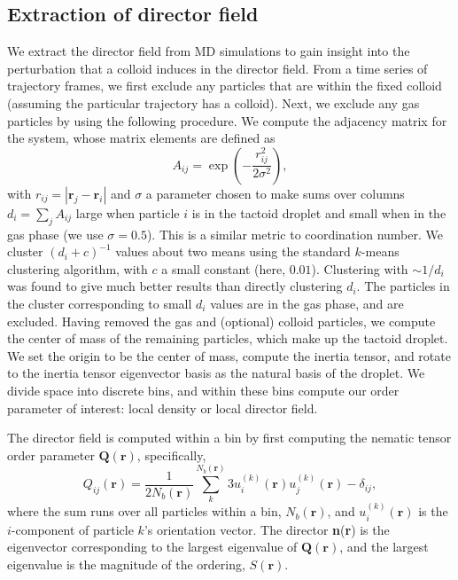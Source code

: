\documentclass[%
 aip,
 amsmath,amssymb,
 reprint,%
]{revtex4-1}
\begin{document}
\subsection{Extraction of director field} \label{ss:tactoidExtractDirectorField}
We extract the director field from MD simulations to gain insight into the perturbation that a colloid induces in the director field. From a time series of trajectory frames, we first exclude any particles that are within the fixed colloid (assuming the particular trajectory has a colloid). Next, we exclude any gas particles by using the following procedure. We compute the adjacency matrix for the system, whose matrix elements are defined as
\begin{equation}
A_{ij}=\exp\left(-\frac{r_{ij}^2}{2\sigma^2}\right),
\end{equation}
with $r_{ij} = |\textbf{r}_j-\textbf{r}_i|$ and $\sigma$ a parameter chosen to make sums over columns $d_i = \sum_j A_{ij}$ large when particle $i$ is in the tactoid droplet and small when in the gas phase (we use $\sigma=0.5$). This is a similar metric to coordination number. We cluster $(d_i+c)^{-1}$ values about two means using the standard $k$-means clustering algorithm, with $c$ a small constant (here, $0.01$). Clustering with $\sim 1/d_i$ was found to give much better results than directly clustering $d_i$. The particles in the cluster corresponding to small $d_i$ values are in the gas phase, and are excluded. Having removed the gas and (optional) colloid particles, we compute the center of mass of the remaining particles, which make up the tactoid droplet. We set the origin to be the center of mass, compute the inertia tensor, and rotate to the inertia tensor eigenvector basis as the natural basis of the droplet. We divide space into discrete bins, and within these bins compute our order parameter of interest: local density or local director field.

The director field is computed within a bin by first computing the nematic tensor order parameter $\textbf{Q}(\textbf{r})$, specifically,
\begin{equation}
Q_{ij}(\textbf{r})=\frac{1}{2N_{b}(\textbf{r})}\sum_k^{N_{b}(\textbf{r})} 3 u_i^{(k)}(\textbf{r}) u_j^{(k)}(\textbf{r}) - \delta_{ij},
\end{equation}
where the sum runs over all particles within a bin, $N_{b}(\textbf{r})$, and $u_i^{(k)}(\textbf{r})$ is the $i$-component of particle $k$'s orientation vector. The director \textbf{n}(\textbf{r}) is the eigenvector corresponding to the largest eigenvalue of $\textbf{Q}(\textbf{r})$, and the largest eigenvalue is the magnitude of the ordering, $S(\textbf{r})$.
\end{document}
